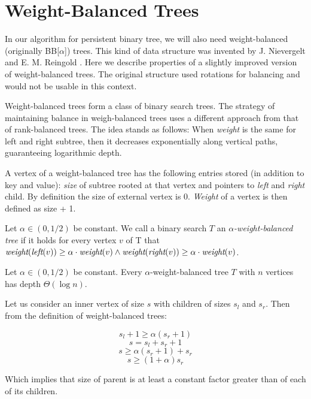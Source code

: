 \section{Weight-Balanced Trees}

In our algorithm for persistent binary tree, we will also need weight-balanced (originally BB[$\alpha$]) trees. This kind of data structure was invented by J. Nievergelt and E. M. Reingold \cite{weight-balanced}. Here we describe properties of a slightly improved version of weight-balanced trees. The original structure used rotations for balancing and would not be usable in this context.

Weight-balanced trees form a class of binary search trees. The strategy of maintaining balance in weigh-balanced trees uses a different approach from that of rank-balanced trees. The idea stands as follows: When \emph{weight} is the same for left and right subtree, then it decreases exponentially along vertical paths, guaranteeing logarithmic depth.

A vertex of a weight-balanced tree has the following entries stored (in addition to key and value): {\em size} of subtree rooted at that vertex and pointers to {\em left} and {\em right} child. By definition the size of external vertex is 0. {\em Weight} of a vertex is then defined as size + 1.

\begin{defn}
Let $\alpha \in (0,1/2)$ be constant. We call a binary search $T$ an {\em $\alpha$-weight-balanced tree} if it holds for every vertex $v$ of T that $\text{\it weight}(\text{\it left}(v)) \geq \alpha \cdot \text{\it weight}(v) \wedge \text{\it weight}(\text{\it right}(v)) \geq \alpha \cdot \text{\it weight}(v) $.
\end{defn}

\begin{prop}
Let $\alpha \in (0,1/2)$ be constant. Every $\alpha$-weight-balanced tree $T$ with $n$ vertices has depth $\Theta(\log n)$. 
\end{prop}

\begin{myproof}
Let us consider an inner vertex of size $s$ with children of sizes $s_l$ and $s_r$. Then from the definition of weight-balanced trees:

$$s_l + 1 \geq \alpha (s_r+1)$$
$$ s = s_l + s_r + 1 $$
$$ s \geq \alpha (s_r+1) + s_r $$
$$ s \geq (1+\alpha)s_r $$

Which implies that size of parent is at least a constant factor greater than of each of its children.
\end{myproof}

